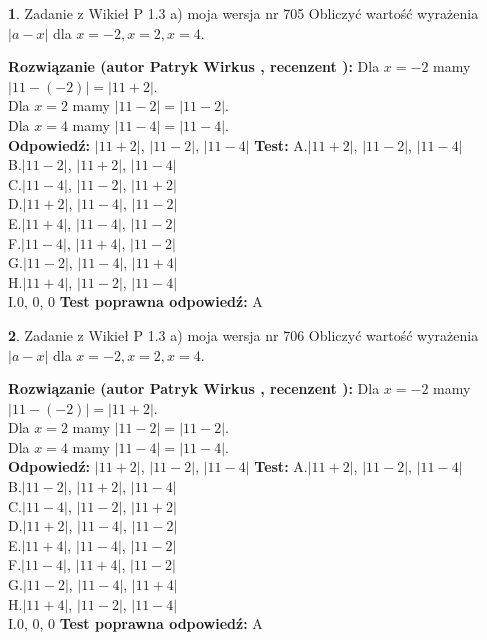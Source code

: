 \documentclass[12pt, a4paper]{article}
\theoremstyle{definition} %
\newtheorem{zad}{}
\newcommand{\zadStart}[1]{\begin{zad}#1\newline}
\newcommand{\zadStop}{\end{zad}}
\newcommand{\rozwStart}[2]{\noindent \textbf{Rozwiązanie (autor #1 , recenzent #2): }\newline}
\newcommand{\rozwStop}{\newline}
\newcommand{\odpStart}{\noindent \textbf{Odpowiedź:}\newline}
\newcommand{\odpStop}{\newline}
\newcommand{\testStart}{\noindent \textbf{Test:}\newline}
\newcommand{\testStop}{\newline}
\newcommand{\kluczStart}{\noindent \textbf{Test poprawna odpowiedź:}\newline}
\newcommand{\kluczStop}{\newline}
\begin{document}
\zadStart{Zadanie z Wikieł P 1.3 a) moja wersja nr 705}
Obliczyć wartość wyrażenia $|a - x|$ dla $x=-2,x=2,x=4$.
\zadStop
\rozwStart{Patryk Wirkus}{}
Dla $x = -2$ mamy $|11 - (-2)| = |11 + 2|$.\\
Dla $x = 2$ mamy $|11 - 2| = |11 - 2|$.\\
Dla $x = 4$ mamy $|11 - 4| = |11 - 4|$.\\
\rozwStop
\odpStart
$|11 + 2|$, $|11 - 2|$, $|11 - 4|$
\odpStop
\testStart
A.$|11 + 2|$, $|11 - 2|$, $|11 - 4|$\\
B.$|11 - 2|$, $|11 + 2|$, $|11 - 4|$\\
C.$|11 - 4|$, $|11 - 2|$, $|11 + 2|$\\
D.$|11 + 2|$, $|11 - 4|$, $|11 - 2|$\\
E.$|11 + 4|$, $|11 - 4|$, $|11 - 2|$\\
F.$|11 - 4|$, $|11 + 4|$, $|11 - 2|$\\
G.$|11 - 2|$, $|11 - 4|$, $|11 + 4|$\\
H.$|11 + 4|$, $|11 - 2|$, $|11 - 4|$\\
I.$0$, $0$, $0$
\testStop
\kluczStart
A
\kluczStop



\zadStart{Zadanie z Wikieł P 1.3 a) moja wersja nr 706}
Obliczyć wartość wyrażenia $|a - x|$ dla $x=-2,x=2,x=4$.
\zadStop
\rozwStart{Patryk Wirkus}{}
Dla $x = -2$ mamy $|11 - (-2)| = |11 + 2|$.\\
Dla $x = 2$ mamy $|11 - 2| = |11 - 2|$.\\
Dla $x = 4$ mamy $|11 - 4| = |11 - 4|$.\\
\rozwStop
\odpStart
$|11 + 2|$, $|11 - 2|$, $|11 - 4|$
\odpStop
\testStart
A.$|11 + 2|$, $|11 - 2|$, $|11 - 4|$\\
B.$|11 - 2|$, $|11 + 2|$, $|11 - 4|$\\
C.$|11 - 4|$, $|11 - 2|$, $|11 + 2|$\\
D.$|11 + 2|$, $|11 - 4|$, $|11 - 2|$\\
E.$|11 + 4|$, $|11 - 4|$, $|11 - 2|$\\
F.$|11 - 4|$, $|11 + 4|$, $|11 - 2|$\\
G.$|11 - 2|$, $|11 - 4|$, $|11 + 4|$\\
H.$|11 + 4|$, $|11 - 2|$, $|11 - 4|$\\
I.$0$, $0$, $0$
\testStop
\kluczStart
A
\kluczStop
\end{document}

